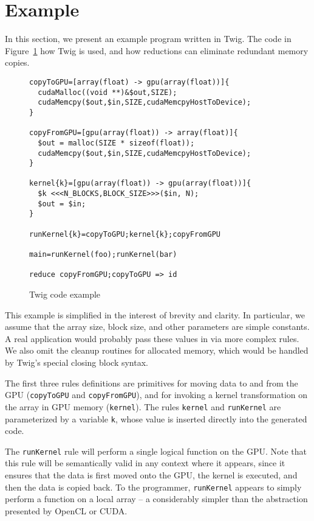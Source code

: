 
\section{Example}
\label{sec:example}

In this section, we present an example program written in Twig. The code in Figure~\ref{fig:example-code} how Twig is used, and how reductions can eliminate redundant memory copies.

\begin{figure}[ht]
\begin{verbatim}
copyToGPU=[array(float) -> gpu(array(float))]{
  cudaMalloc((void **)&$out,SIZE);
  cudaMemcpy($out,$in,SIZE,cudaMemcpyHostToDevice);
}

copyFromGPU=[gpu(array(float)) -> array(float)]{
  $out = malloc(SIZE * sizeof(float));
  cudaMemcpy($out,$in,SIZE,cudaMemcpyHostToDevice);
}

kernel{k}=[gpu(array(float)) -> gpu(array(float))]{
  $k <<<N_BLOCKS,BLOCK_SIZE>>>($in, N);
  $out = $in;
}

runKernel{k}=copyToGPU;kernel{k};copyFromGPU

main=runKernel(foo);runKernel(bar)

reduce copyFromGPU;copyToGPU => id
\end{verbatim}
\caption{Twig code example}
\label{fig:example-code}
\end{figure}

This example is simplified in the interest of brevity and clarity. In particular, we assume that the array size, block size, and other parameters are simple constants. A real application would probably pass these values in via more complex rules. We also omit the cleanup routines for allocated memory, which would be handled by Twig's special closing block syntax.

The first three rules definitions are primitives for moving data to and from the GPU (\texttt{copyToGPU} and \texttt{copyFromGPU}), and for invoking a kernel transformation on the array in GPU memory (\texttt{kernel}). The rules \texttt{kernel} and \texttt{runKernel} are parameterized by a variable \texttt{k}, whose value is inserted directly into the generated code.

The \texttt{runKernel} rule will perform a single logical function on the GPU. Note that this rule will be semantically valid in any context where it appears, since it ensures that the data is first moved onto the GPU, the kernel is executed, and then the data is copied back. To the programmer, \texttt{runKernel} appears to simply perform a function on a local array -- a considerably simpler than the abstraction presented by OpenCL or CUDA.

